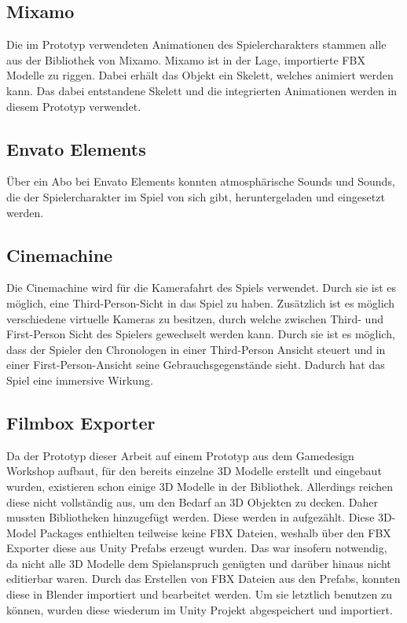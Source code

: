 \subsection{Mixamo}
Die im Prototyp verwendeten Animationen des Spielercharakters stammen alle aus der Bibliothek von Mixamo. Mixamo ist in der Lage, importierte \ac{FBX} Modelle zu riggen. Dabei erhält das Objekt ein Skelett, welches animiert werden kann. Das dabei entstandene Skelett und die integrierten Animationen werden in diesem Prototyp verwendet.

\subsection{Envato Elements}
Über ein Abo bei Envato Elements konnten atmosphärische Sounds und Sounds, die der Spielercharakter im Spiel von sich gibt, heruntergeladen und eingesetzt werden.

\subsection{Cinemachine}
Die Cinemachine wird für die Kamerafahrt des Spiels verwendet. Durch sie ist es möglich, eine Third-Person-Sicht in das Spiel zu haben. Zusätzlich ist es möglich verschiedene virtuelle Kameras zu besitzen, durch welche zwischen Third- und First-Person Sicht des Spielers gewechselt werden kann. Durch sie ist es möglich, dass der Spieler den Chronologen in einer Third-Person Ansicht steuert und in einer First-Person-Ansicht seine Gebrauchsgegenstände sieht. Dadurch hat das Spiel eine immersive Wirkung.

\subsection{Filmbox Exporter}
Da der Prototyp dieser Arbeit auf einem Prototyp aus dem Gamedesign Workshop aufbaut, für den bereits einzelne \ac{3D} Modelle erstellt und eingebaut wurden, existieren schon einige \ac{3D} Modelle in der Bibliothek. Allerdings reichen diese nicht vollständig aus, um den Bedarf an \ac{3D} Objekten zu decken. Daher mussten Bibliotheken hinzugefügt werden. Diese werden in  aufgezählt. Diese \ac{3D}-Model Packages enthielten teilweise keine \ac{FBX} Dateien, weshalb über den \ac{FBX} Exporter diese aus Unity Prefabs erzeugt wurden. Das war insofern notwendig, da nicht alle \ac{3D} Modelle dem Spielanspruch genügten und darüber hinaus nicht editierbar waren. Durch das Erstellen von \ac{FBX} Dateien aus den Prefabs, konnten diese in Blender importiert und bearbeitet werden. Um sie letztlich benutzen zu können, wurden diese wiederum im Unity Projekt abgespeichert und importiert.

